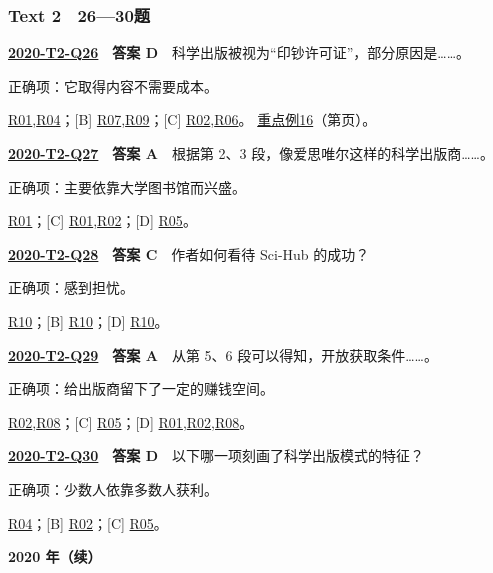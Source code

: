 \documentclass[11pt,a4paper]{article}
\begin{document}
\subsubsection{Text 2　26—30题}
\label{idx-2020-T2-Q26}
\noindent\textbf{\href{https://zj139.github.io/math-notes/english/6e15b3011263b94671dc7411/\#q26}{2020-T2-Q26}　答案 D}　科学出版被视为“印钞许可证”，部分原因是……。\par\nopagebreak
\noindent 正确项：它取得内容不需要成本。\par\nopagebreak
\noindent [A] \hyperref[cat-R01]{R01},\hyperref[cat-R04]{R04}；[B] \hyperref[cat-R07]{R07},\hyperref[cat-R09]{R09}；[C] \hyperref[cat-R02]{R02},\hyperref[cat-R06]{R06}。
\hyperref[case-2020-T2-Q26]{重点例16}（第\pageref{case-2020-T2-Q26}页）。
\par\smallskip
{}\label{idx-2020-T2-Q27}
\noindent\textbf{\href{https://zj139.github.io/math-notes/english/6e15b3011263b94671dc7411/\#q27}{2020-T2-Q27}　答案 A}　根据第 2、3 段，像爱思唯尔这样的科学出版商……。\par\nopagebreak
\noindent 正确项：主要依靠大学图书馆而兴盛。\par\nopagebreak
\noindent [B] \hyperref[cat-R01]{R01}；[C] \hyperref[cat-R01]{R01},\hyperref[cat-R02]{R02}；[D] \hyperref[cat-R05]{R05}。
\par\smallskip
{}\label{idx-2020-T2-Q28}
\noindent\textbf{\href{https://zj139.github.io/math-notes/english/6e15b3011263b94671dc7411/\#q28}{2020-T2-Q28}　答案 C}　作者如何看待 Sci-Hub 的成功？\par\nopagebreak
\noindent 正确项：感到担忧。\par\nopagebreak
\noindent [A] \hyperref[cat-R10]{R10}；[B] \hyperref[cat-R10]{R10}；[D] \hyperref[cat-R10]{R10}。
\par\smallskip
{}\label{idx-2020-T2-Q29}
\noindent\textbf{\href{https://zj139.github.io/math-notes/english/6e15b3011263b94671dc7411/\#q29}{2020-T2-Q29}　答案 A}　从第 5、6 段可以得知，开放获取条件……。\par\nopagebreak
\noindent 正确项：给出版商留下了一定的赚钱空间。\par\nopagebreak
\noindent [B] \hyperref[cat-R02]{R02},\hyperref[cat-R08]{R08}；[C] \hyperref[cat-R05]{R05}；[D] \hyperref[cat-R01]{R01},\hyperref[cat-R02]{R02},\hyperref[cat-R08]{R08}。
\par\smallskip
{}\label{idx-2020-T2-Q30}
\noindent\textbf{\href{https://zj139.github.io/math-notes/english/6e15b3011263b94671dc7411/\#q30}{2020-T2-Q30}　答案 D}　以下哪一项刻画了科学出版模式的特征？\par\nopagebreak
\noindent 正确项：少数人依靠多数人获利。\par\nopagebreak
\noindent [A] \hyperref[cat-R04]{R04}；[B] \hyperref[cat-R02]{R02}；[C] \hyperref[cat-R05]{R05}。
\par\smallskip
\clearpage\noindent\textbf{2020 年（续）}\par
\end{document}
